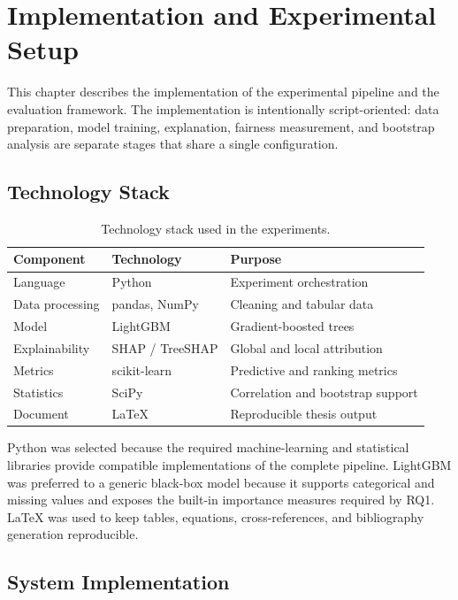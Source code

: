 \chapter{Implementation and Experimental Setup}
\label{chap:implementation}

This chapter describes the implementation of the experimental pipeline and the
evaluation framework. The implementation is intentionally script-oriented:
data preparation, model training, explanation, fairness measurement, and
bootstrap analysis are separate stages that share a single configuration.

\section{Technology Stack}

\begin{table}[H]
\centering
\caption{Technology stack used in the experiments.}
\label{tab:technology-stack}
\begin{tabular}{lll}
\toprule
\textbf{Component} & \textbf{Technology} & \textbf{Purpose}\\
\midrule
Language & Python & Experiment orchestration\\
Data processing & pandas, NumPy & Cleaning and tabular data\\
Model & LightGBM & Gradient-boosted trees\\
Explainability & SHAP / TreeSHAP & Global and local attribution\\
Metrics & scikit-learn & Predictive and ranking metrics\\
Statistics & SciPy & Correlation and bootstrap support\\
Document & LaTeX & Reproducible thesis output\\
\bottomrule
\end{tabular}
\end{table}

Python was selected because the required machine-learning and statistical
libraries provide compatible implementations of the complete pipeline.
LightGBM was preferred to a generic black-box model because it supports
categorical and missing values and exposes the built-in importance measures
required by RQ1. LaTeX was used to keep tables, equations, cross-references,
and bibliography generation reproducible.

\section{System Implementation}

